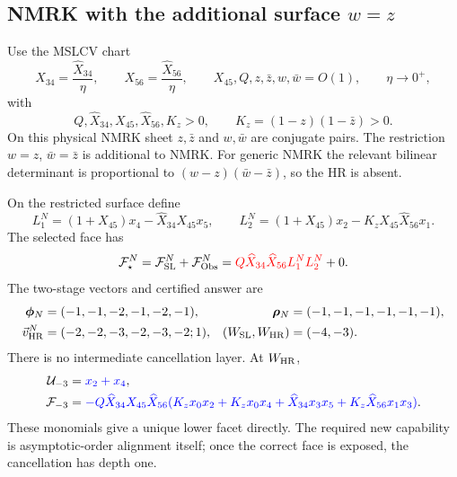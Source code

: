 \documentclass[a4paper,11pt]{article}
\newcommand{\FSL}{\mathcal F_{\rm SL}}
\newcommand{\FObs}{\mathcal F_{\rm Obs}}
\newcommand{\WSL}{W_{\rm SL}}
\newcommand{\WHR}{W_{\rm HR}}
\newcommand{\vHR}{\vec v_{\rm HR}}
\newcommand{\SLcolour}[1]{{\color{red}#1}}
\newcommand{\HRcolour}[1]{{\color{blue}#1}}
\begin{document}
\subsection{NMRK with the additional surface \texorpdfstring{\(w=z\)}{w=z}}

Use the MSLCV chart
\begin{equation}
 X_{34}=\frac{\widehat X_{34}}{\eta},\qquad
 X_{56}=\frac{\widehat X_{56}}{\eta},\qquad
 X_{45},Q,z,\bar z,w,\bar w=O(1),\qquad \eta\to0^+,
 \label{eq:nmrk-scaling-example}
\end{equation}
with
\begin{equation}
 Q,\widehat X_{34},X_{45},\widehat X_{56},K_z>0,\qquad
 K_z=(1-z)(1-\bar z)>0.
 \label{eq:nmrk-domain-example}
\end{equation}
On this physical NMRK sheet \(z,\bar z\) and \(w,\bar w\) are conjugate
pairs.  The restriction \(w=z\), \(\bar w=\bar z\) is additional to NMRK.
For generic NMRK the relevant bilinear determinant is proportional to
\((w-z)(\bar w-\bar z)\), so the HR is absent.

On the restricted surface define
\begin{equation}
 L_1^N=(1+X_{45})x_4-\widehat X_{34}X_{45}x_5,\qquad
 L_2^N=(1+X_{45})x_2-K_zX_{45}\widehat X_{56}x_1.
 \label{eq:nmrk-factors-example}
\end{equation}
The selected face has
\begin{equation}
 \mathcal F_\star^N=\FSL^N+\FObs^N
 =\SLcolour{Q\widehat X_{34}\widehat X_{56}L_1^NL_2^N}+0.
 \label{eq:nmrk-decomposition-example}
\end{equation}
The two-stage vectors and certified answer are
\begin{align}
 \boldsymbol\phi_N&=(-1,-1,-2,-1,-2,-1),&
 \boldsymbol\rho_N&=(-1,-1,-1,-1,-1,-1),\nonumber\\
 \vHR^N&=(-2,-2,-3,-2,-3,-2;1),&
 (\WSL,\WHR)&=(-4,-3).
 \label{eq:nmrk-vector-example}
\end{align}
There is no intermediate cancellation layer.  At \(\WHR\),
\begin{align}
 \mathcal U_{-3}&=\HRcolour{x_2+x_4},\nonumber\\
 \mathcal F_{-3}&=\HRcolour{-Q\widehat X_{34}X_{45}\widehat X_{56}
 (K_zx_0x_2+K_zx_0x_4+\widehat X_{34}x_3x_5
 +K_z\widehat X_{56}x_1x_3)}.
 \label{eq:nmrk-WHR-example}
\end{align}
These monomials give a unique lower facet directly.  The required new
capability is asymptotic-order alignment itself; once the correct face is
exposed, the cancellation has depth one.
\end{document}
